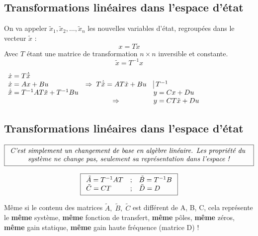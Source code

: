 \documentclass[document.tex]{subfiles}
\begin{document}
\subsection{Transformations linéaires dans l'espace d'état}

On va appeler $\tilde{x}_1, \tilde{x}_2,\ldots, \tilde{x}_n$ les nouvelles variables d'état, regroupées dans le vecteur $\tilde{x}$ : 
\begin{equation}
x=T\tilde{x}
\end{equation}
Avec $T$ étant une matrice de transformation $n \times n$ inversible et constante.
\begin{equation}
\boxed{\tilde{x}=T^{-1}x}
\end{equation}

\begin{center}
$
\begin{array}{l c l}
\dot{x}=T\dot{\tilde{x}} & \; & \; \\
\dot{x}=Ax+Bu &\Rightarrow \; T\dot{\tilde{x}}=AT\tilde{x}+Bu & \vline\; T^{-1}\\
\dot{\tilde{x}}=T^{-1}AT\tilde{x}+T^{-1}Bu & \; & y = Cx + Du \\
\; & \Rightarrow & y = CT\tilde{x} + Du
\end{array}
$
\end{center}


\subsection{Transformations linéaires dans l'espace d'état}


\begin{center}
$
\boxed{
\begin{array}{c}
\text{\textit{C'est simplement un changement de base en algèbre linéaire. Les propriété du }}
\\
\text{\textit{système ne change pas, seulement sa représentation dans l'espace !}}
\end{array}
}
$
\end{center}


\begin{equation}
\boxed{
\begin{array}{l c l}
\tilde{A}=T^{-1}AT & ; & \tilde{B}=T^{-1}B \\
\tilde{C}=CT & ; & \tilde{D}=D
\end{array}}
\end{equation}

Même si le contenu des matrices $\tilde{A},\;\tilde{B},\;\tilde{C}$ est différent de A, B, C, cela représente le \textbf{même} système, \textbf{même} fonction de transfert, \textbf{même} pôles, \textbf{même} zéros, \textbf{même} gain statique, \textbf{même} gain haute fréquence (matrice D) !\\
\end{document}
